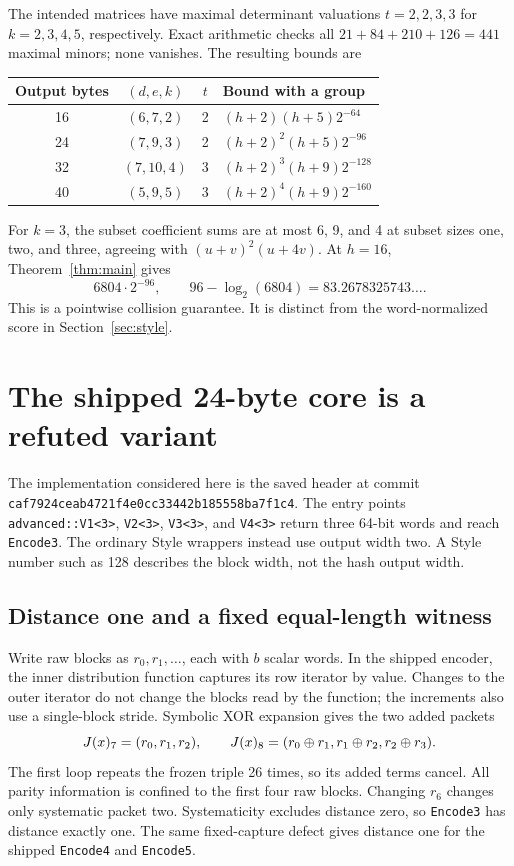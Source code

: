 The intended matrices have maximal determinant valuations $t=2,2,3,3$ for $k=2,3,4,5$, respectively. Exact arithmetic checks all $21+84+210+126=441$ maximal minors; none vanishes\cite{second,fourth}. The resulting bounds are
\begin{center}
\begin{tabular}{@{}cccl@{}}\toprule
Output bytes&$(d,e,k)$&$t$&Bound with a group\\\midrule
16&$(6,7,2)$&2&$(h+2)(h+5)2^{-64}$\\
24&$(7,9,3)$&2&$(h+2)^2(h+5)2^{-96}$\\
32&$(7,10,4)$&3&$(h+2)^3(h+9)2^{-128}$\\
40&$(5,9,5)$&3&$(h+2)^4(h+9)2^{-160}$\\\bottomrule
\end{tabular}
\end{center}
For $k=3$, the subset coefficient sums are at most 6, 9, and 4 at subset sizes one, two, and three, agreeing with $(u+v)^2(u+4v)$. At $h=16$, Theorem~\ref{thm:main} gives
\begin{equation}\label{eq:83}
 6804\cdot2^{-96},\qquad96-\log_2(6804)=83.2678325743\ldots.
\end{equation}
This is a pointwise collision guarantee. It is distinct from the word-normalized score in Section~\ref{sec:style}.

\section{The shipped 24-byte core is a refuted variant}\label{sec:shipped}
The implementation considered here is the saved header at commit
\texttt{caf7924ceab4721f4}\allowbreak\texttt{e0cc33442b185558ba7f1c4}. The entry points
\texttt{advanced::V1<3>}, \texttt{V2<3>}, \texttt{V3<3>}, and \texttt{V4<3>}
return three 64-bit words and reach \texttt{Encode3}. The ordinary Style wrappers instead use output width two. A Style number such as 128 describes the block width, not the hash output width.

\subsection{Distance one and a fixed equal-length witness}
Write raw blocks as $r_0,r_1,\ldots$, each with $b$ scalar words. In the shipped encoder, the inner distribution function captures its row iterator by value. Changes to the outer iterator do not change the blocks read by the function; the increments also use a single-block stride. Symbolic XOR expansion gives the two added packets
\begin{equation}\label{eq:bad}
 J(x)_7=(r_0,r_1,r_2),\qquad
 J(x)_8=(r_0\mathbin\oplus r_1,r_1\mathbin\oplus r_2,r_2\mathbin\oplus r_3).
\end{equation}
The first loop repeats the frozen triple 26 times, so its added terms cancel. All parity information is confined to the first four raw blocks. Changing $r_6$ changes only systematic packet two. Systematicity excludes distance zero, so \texttt{Encode3} has distance exactly one. The same fixed-capture defect gives distance one for the shipped \texttt{Encode4} and \texttt{Encode5}\cite{proof,fourth}.

